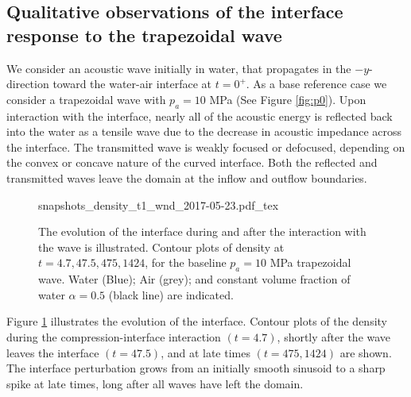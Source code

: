 \documentclass{jfm}%
\begin{document}
\subsection{Qualitative observations of the interface response to the trapezoidal wave}
\label{subsec:Qualitative}
We consider an acoustic wave initially in water, that propagates in
the $-y$-direction toward the water-air interface at $t = 0^+$. As a
base reference case we consider a trapezoidal wave with $p_a = 10$ MPa
(See Figure \ref{fig:p0}). Upon interaction with the interface, nearly
all of the acoustic energy is reflected back into the water as a
tensile wave due to the decrease in acoustic impedance across the
interface. The transmitted wave is weakly focused or defocused,
depending on the convex or concave nature of the curved interface. Both the
reflected and transmitted waves leave the domain at the inflow and outflow
boundaries.
% 
\begin{figure}
  \centering
  \def\svgwidth{0.95\textwidth}
  {snapshots_density_t1_wnd_2017-05-23.pdf_tex}
  \caption[The evolution of the acoustically perturbed interface]
  {The evolution of the interface during and after the interaction
    with the wave is illustrated. Contour plots of density at
    $t=4.7, 47.5, 475, 1424$, %
    for the baseline $p_a = 10$ MPa trapezoidal wave. Water (Blue);
    Air (grey); and constant volume fraction of water $\alpha=0.5$
    (black line) are indicated.}
  \label{fig:interface_snapshots}
\end{figure}
% 
Figure \ref{fig:interface_snapshots} illustrates the evolution of the
interface. Contour plots of the density during the
compression-interface interaction $(t = 4.7)$, shortly after the wave
leaves the interface $(t = 47.5)$, and at late times $(t = 475, 1424)$ are
shown. The interface perturbation grows from an initially smooth
sinusoid to a sharp spike at late times, long after all waves have
left the domain.
% 
\end{document}

